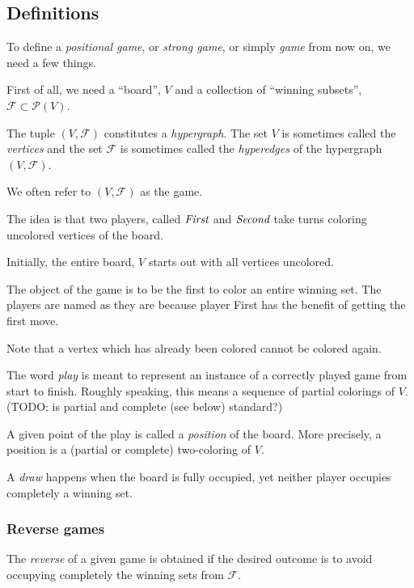 \subsection{Definitions}

To define a \emph{positional game}, or \emph{strong game}, or simply \emph{game} from now on, we need a few things.

First of all, we need a ``board'', $V$ and a collection of ``winning subsets'', $\mathcal F \subset \mathcal P(V)$.

The tuple $(V,\mathcal F)$ constitutes a \emph{hypergraph}.
The set $V$ is sometimes called the \emph{vertices} and the set $\mathcal F$ is sometimes called the \emph{hyperedges} of the hypergraph $(V,\mathcal F)$.

\begin{remark}
We often refer to $(V,\mathcal F)$ as the game.
\end{remark}

The idea is that two players, called $\emph{First}$ and $\emph{Second}$ take turns coloring uncolored vertices of the board.

Initially, the entire board, $V$ starts out with all vertices uncolored.

The object of the game is to be the first to color an entire winning set.
The players are named as they are because player First has the benefit of getting the first move.

Note that a vertex which has already been colored cannot be colored again.

The word \emph{play} is meant to represent an instance of a correctly played game from start to finish.
Roughly speaking, this means a sequence of partial colorings of $V$.
(TODO: is partial and complete (see below) standard?)

A given point of the play is called a \emph{position} of the board.
More precisely, a position is a (partial or complete) two-coloring of $V$.

A \emph{draw} happens when the board is fully occupied, yet neither player occupies completely a winning set.

\subsubsection{Reverse games}

The \emph{reverse} of a given game is obtained if the desired outcome is to avoid occupying completely the winning sets from $\mathcal F$.

